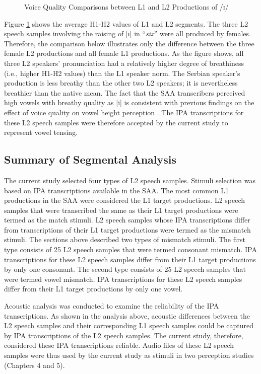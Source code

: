 \begin{figure}[ht]
  \figSpace
    \centering
  
    \caption{Voice Quality Comparisons between L1 and L2 Productions of /ɪ/}
    \label{fig:h1h2}
  \figSpace
\end{figure}

Figure \ref{fig:h1h2} shows the average H1-H2 values of L1 and L2 segments. The three L2 speech samples involving the raising of [ɪ] in “\textit{six}” were all produced by females. Therefore, the comparison below illustrates only the difference between the three female L2 productions and all female L1 productions. As the figure shows, all three L2 speakers’ pronunciation had a relatively higher degree of breathiness (i.e., higher H1-H2 values) than the L1 speaker norm. The Serbian speaker’s production is less breathy than the other two L2 speakers; it is nevertheless breathier than the native mean. The fact that the SAA transcribers perceived high vowels with breathy quality as [i] is consistent with previous findings on the effect of voice quality on vowel height perception \citep{Lotto_1997}. The IPA transcriptions for these L2 speech samples were therefore accepted by the current study to represent vowel tensing. 



\subsection{Summary of Segmental Analysis}

The current study selected four types of L2 speech samples. Stimuli selection was based on IPA transcriptions available in the SAA. The most common L1 productions in the SAA were considered the L1 target productions. L2 speech samples that were transcribed the same as their L1 target productions were termed as the match stimuli. L2 speech samples whose IPA transcriptions differ from transcriptions of their L1 target productions were termed as the mismatch stimuli. The sections above described two types of mismatch stimuli. The first type consists of 25 L2 speech samples that were termed consonant mismatch. IPA transcriptions for these L2 speech samples differ from their L1 target productions by only one consonant. The second type consists of 25 L2 speech samples that were termed vowel mismatch. IPA transcriptions for these L2 speech samples differ from their L1 target productions by only one vowel. 

Acoustic analysis was conducted to examine the reliability of the IPA transcriptions. As shown in the analysis above, acoustic differences between the L2 speech samples and their corresponding L1 speech samples could be captured by IPA transcriptions of the L2 speech samples. The current study, therefore, considered these IPA transcriptions reliable. Audio files of these L2 speech samples were thus used by the current study as stimuli in two perception studies (Chapters 4 and 5). 

